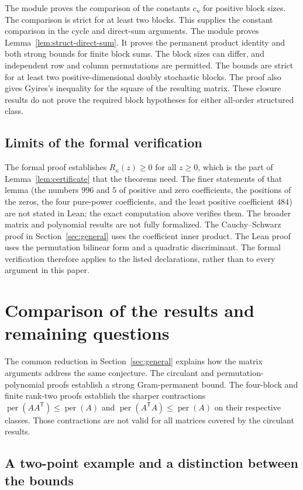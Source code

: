 \documentclass[11pt,a4paper]{article}
\theoremstyle{definition}
\theoremstyle{remark}
\newcommand{\per}{\operatorname{per}}
\newcommand{\T}{\mathsf{T}}
\begin{document}
The module  proves the comparison of the constants $c_n$ for positive block sizes.
The comparison is strict for at least two blocks.
This supplies the constant comparison in the cycle and direct-sum arguments.
The module  proves Lemma~\ref{lem:struct-direct-sum}.
It proves the permanent product identity and both strong bounds for finite block sums.
The block sizes can differ, and independent row and column permutations are permitted.
The bounds are strict for at least two positive-dimensional doubly stochastic blocks.
The proof also gives Gyires's inequality for the square of the resulting matrix.
These closure results do not prove the required block hypotheses for either all-order structured class.

\subsection{Limits of the formal verification}
The formal proof establishes $R_\kappa(z)\ge0$ for all $z\ge0$, which is the part of Lemma~\ref{lem:certificate} that
the theorems need. The finer statements of that lemma (the numbers $996$ and $5$ of positive and zero coefficients,
the positions of the zeros, the four pure-power coefficients, and the least positive coefficient $484$) are not stated
in Lean; the exact computation above verifies them.
The broader matrix and polynomial results are not fully formalized.
The Cauchy--Schwarz proof in Section~\ref{sec:general} uses the coefficient inner product.
The Lean proof uses the permutation bilinear form and a quadratic discriminant.
The formal verification therefore applies to the listed declarations, rather than to every argument in this paper.


\section{Comparison of the results and remaining questions}\label{sec:discussion}

The common reduction in Section~\ref{sec:general} explains how the matrix arguments address the same conjecture.
The circulant and permutation-polynomial proofs establish a strong Gram-permanent bound.
The four-block and finite rank-two proofs establish the sharper contractions $\per(AA^\T)\le\per(A)$ and $\per(A^\T A)\le\per(A)$ on their respective classes.
Those contractions are not valid for all matrices covered by the circulant results.

\subsection{A two-point example and a distinction between the bounds}
\end{document}
